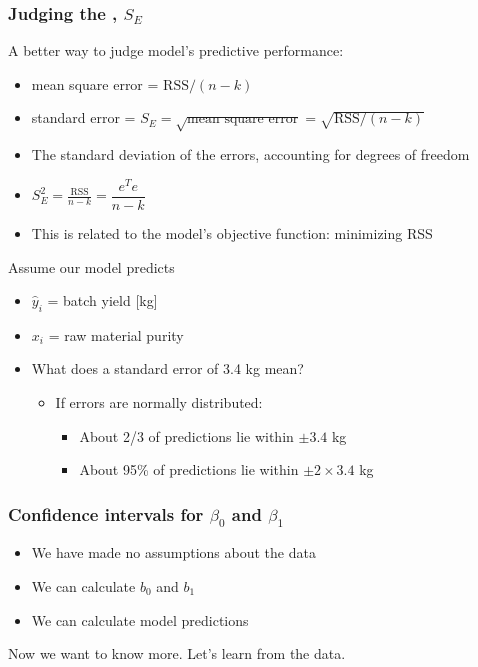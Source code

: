 \begin{frame}\frametitle{Judging the {\color{purple}{standard error}}, $S_E$}

	A better way to judge model's predictive performance:
	\begin{itemize}
		\item	mean square error = $\text{RSS}/(n-k)$
		\item	standard error = $S_E = \sqrt{\text{mean square error}} = \sqrt{\text{RSS}/(n-k)}$
		\item	The standard deviation of the errors, accounting for degrees of freedom
		\item	$S_E^2 = \frac{\displaystyle \text{RSS}}{\displaystyle n-k} = \dfrac{e^Te}{\displaystyle n-k}$
		\item	This is related to the model's objective function: minimizing RSS
	\end{itemize}

	Assume our model predicts
	\begin{itemize}
		\item	$\hat{y}_i$ = batch yield [kg]
		\item	$x_i$ = raw material purity
		\item	What does a standard error of 3.4 kg mean?
		\begin{itemize}
			\item	If errors are normally distributed:
			\begin{itemize}
				\item	About 2/3 of predictions lie within $\pm 3.4$ kg
				\item	About 95\% of predictions lie within $\pm 2 \times 3.4$ kg
			\end{itemize}
		\end{itemize}
	\end{itemize}
\end{frame}

\begin{frame}\frametitle{Confidence intervals for {\color{red}$\beta_0$ and $\beta_1$}}
	\begin{itemize}
		\item	We have made no assumptions about the data
		\item	We can calculate $b_0$ and $b_1$
		\item	We can calculate model predictions
	\end{itemize}
	
	
	\vspace{12pt}
	Now we want to know more. Let's learn from the data.
\end{frame}

